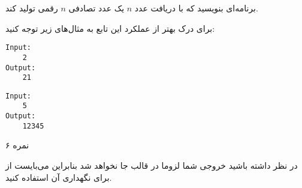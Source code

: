 \documentclass[../main.tex]{subfiles}
\begin{document}

برنامه‌ای بنویسید که با دریافت عدد
$n$
یک عدد تصادفی
$n$
رقمی تولید کند.

برای درک بهتر از عملکرد این تابع به مثال‌های زیر توجه کنید:

\begin{latin}
\begin{verbatim}
Input:
    2
Output:
    21
\end{verbatim}
\end{latin}

\begin{latin}
\begin{verbatim}
Input:
    5
Output:
    12345
\end{verbatim}
\end{latin}

۶ نمره

در نظر داشته باشید خروجی شما لزوما در قالب
جا نخواهد شد بنابراین می‌بایست از
برای نگهداری آن استفاده کنید.
\end{document}
